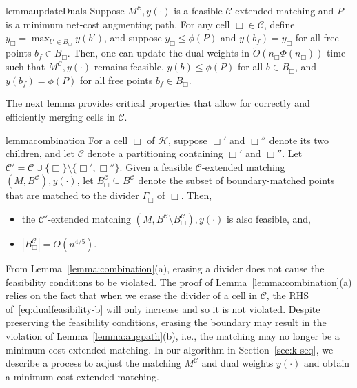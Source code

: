 \documentclass[11pt,onecolumn]{article}
\def\mcC{{\mathcal{C}}}
\def\mcH{{\mathcal{H}}}
\newcommand{\cell}{\Box}
\begin{document}
\begin{restatable}{lemma}{updateDuals}\label{lemma:fresh_duals}
        Suppose $M^\mcC, y(\cdot)$ is a feasible $\mcC$-extended matching and $P$ is a minimum net-cost augmenting path. For any cell $\cell\in\mcC$, define $y_\cell=\max_{b' \in B_{\cell}} y(b')$, and suppose $y_\cell\le \phi(P)$ and $y(b_f)=y_\cell$ for all free points $b_f\in B_\cell$. Then, one can update the dual weights in $\tilde{O}(n_\cell\Phi(n_\cell))$ time such that $M^\mcC, y(\cdot)$ remains feasible, $y(b)\le \phi(P)$ for all $b\in B_\cell$, and $y(b_f)=\phi(P)$ for all free points $b_f\in B_\cell$.
\end{restatable}

\vspace{0.5em}
The next lemma provides critical properties that allow for correctly and efficiently merging cells in $\mcC$. 


\begin{restatable}{lemma}{combination}\label{lemma:combination}
    For a cell $\cell$ of $\mcH$, suppose $\cell'$ and $\cell''$ denote its two children, and let $\mcC$ denote a partitioning containing $\cell'$ and $\cell''$. Let $\mcC'=\mcC\cup\{\cell\}\setminus\{\cell',\cell''\}$. Given a feasible $\mcC$-extended matching $(M, B^\mcC), y(\cdot)$, let $B_\cell^\mcC\subseteq B^\mcC$ denote the subset of boundary-matched points that are matched to the divider $\Gamma_\cell$ of $\cell$. Then,
    \begin{itemize}
        \item[(a)] the $\mcC'$-extended matching $(M, B^\mcC\setminus B_\cell^\mcC), y(\cdot)$ is also feasible, and,
        \item[(b)]  $|B_\cell^\mcC|=O(n^{4/5})$.
    \end{itemize}
\end{restatable}

\vspace{1em}

From Lemma~\ref{lemma:combination}(a), erasing a divider  does not cause the feasibility conditions to be violated. The proof of Lemma~\ref{lemma:combination}(a) relies on the fact that when we erase the divider of a cell in $\mcC$, the RHS of~\eqref{eq:dualfeasibility-b} will only increase and so it is not violated. Despite preserving the feasibility conditions, erasing the boundary may result in the violation of Lemma~\ref{lemma:augpath}(b), i.e., the matching may no longer be a minimum-cost extended matching. 
%
In our algorithm in Section~\ref{sec:k-seq}, we describe a process to adjust the matching $M^\mcC$ and dual weights $y(\cdot)$ and obtain a minimum-cost extended matching. 
\end{document}
